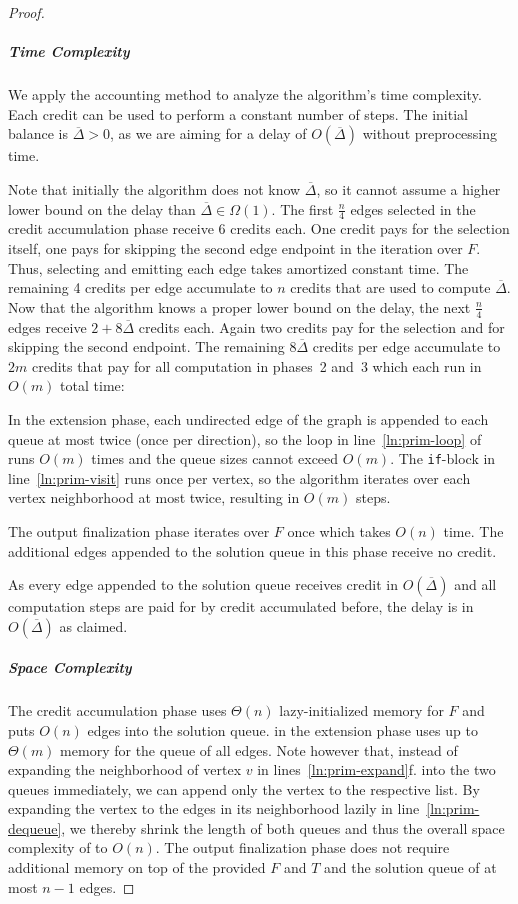 \documentclass[a4paper, USenglish, cleveref, autoref, thm-restate]{lipics-v2021}
\newcommand{\avgdeg}{\overline{\Delta}}
\begin{document}
\begin{proof}
	\subparagraph*{Time Complexity}

	We apply the accounting method to analyze the algorithm's time complexity.
	Each credit can be used to perform a constant number of steps.
	The initial balance is $\avgdeg > 0$, as we are aiming for a delay of $O(\avgdeg)$ without preprocessing time.

	Note that initially the algorithm does not know $\avgdeg$, so it cannot assume a higher lower bound on the delay than $\avgdeg \in \Omega(1)$.
	The first $\frac{n}{4}$ edges selected in the credit accumulation phase receive $6$ credits each.
	One credit pays for the selection itself, one pays for skipping the second edge endpoint in the iteration over $F$.
	Thus, selecting and emitting each edge takes amortized constant time.
	The remaining 4 credits per edge accumulate to $n$ credits that are used to compute $\avgdeg$.
	Now that the algorithm knows a proper lower bound on the delay, the next $\frac{n}{4}$ edges receive $2 + 8\avgdeg$ credits each.
	Again two credits pay for the selection and for skipping the second endpoint.
	The remaining $8\avgdeg$ credits per edge accumulate to $2m$ credits that pay for all computation in phases~2 and~3 which each run in $O(m)$ total time:

	In the extension phase, each undirected edge of the graph is appended to each queue at most twice (once per direction), so the loop in line~\ref{ln:prim-loop} of  runs $O(m)$ times and the queue sizes cannot exceed $O(m)$.
	The \texttt{if}-block in line~\ref{ln:prim-visit} runs once per vertex, so the algorithm iterates over each vertex neighborhood at most twice, resulting in $O(m)$ steps.

	The output finalization phase iterates over $F$ once which takes $O(n)$ time.
	The additional edges appended to the solution queue in this phase receive no credit.

	As every edge appended to the solution queue receives credit in $O(\avgdeg)$ and all computation steps are paid for by credit accumulated before, the delay is in $O(\avgdeg)$ as claimed.

	\subparagraph*{Space Complexity}

	The credit accumulation phase uses $\Theta(n)$ lazy-initialized memory for $F$ and puts $O(n)$ edges into the solution queue.
	 in the extension phase uses up to $\Theta(m)$ memory for the queue of all edges.
	Note however that, instead of expanding the neighborhood of vertex $v$ in lines~\ref{ln:prim-expand}f. into the two queues immediately, we can append only the vertex to the respective list.
	By expanding the vertex to the edges in its neighborhood lazily in line~\ref{ln:prim-dequeue}, we thereby shrink the length of both queues and thus the overall space complexity of  to $O(n)$.
	The output finalization phase does not require additional memory on top of the provided $F$ and $T$ and the solution queue of at most $n-1$ edges.
\end{proof}
\end{document}
